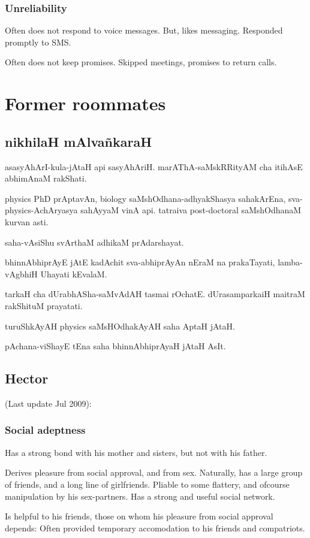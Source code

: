 \documentclass[oneside, article]{memoir}
\begin{document}
\section{Unreliability}
Often does not respond to voice messages. But, likes messaging. Responded promptly to SMS.

Often does not keep promises. Skipped meetings, promises to return calls.

\part{Former roommates}

\chapter{nikhilaH mAlva\~nkaraH}
asasyAhArI-kula-jAtaH api sasyAhAriH. marAThA-saMskRRityAM cha itihAsE abhimAnaM rakShati.

physics PhD prAptavAn, biology saMshOdhana-adhyakShasya sahakArEna, sva-physics-AchAryasya sahAyyaM vinA api. tatraiva post-doctoral saMshOdhanaM kurvan asti.

saha-vAsiShu svArthaM adhikaM prAdarshayat.

bhinnAbhiprAyE jAtE kadAchit sva-abhiprAyAn nEraM na prakaTayati, lamba-vAgbhiH Uhayati kEvalaM.

tarkaH cha dUrabhASha-saMvAdAH tasmai rOchatE. dUrasamparkaiH maitraM rakShituM prayatati.

turuShkAyAH physics saMsHOdhakAyAH saha AptaH jAtaH.

pAchana-viShayE tEna saha bhinnAbhiprAyaH jAtaH AsIt.

\chapter{Hector}
(Last update Jul 2009):

\section{Social adeptness}
Has a strong bond with his mother and sisters, but not with his father.

Derives pleasure from social approval, and from sex. Naturally, has a large group of friends, and a long line of girlfriends.
\subitem Pliable to some flattery, and ofcourse manipulation by his sex-partners.
\subitem Has a strong and useful social network.

Is helpful to his friends, those on whom his pleasure from social approval depends:
\subitem Often provided temporary accomodation to his friends and compatriots.
\end{document}
